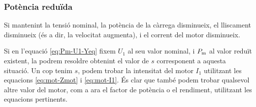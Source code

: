 	
\subsubsection{Potència reduïda}	

Si mantenint la tensió nominal, la potència de la càrrega disminueix, el lliscament disminueix (és a dir, la velocitat augmenta), i el corrent del motor disminueix.
	
Si en l'equació \eqref{eq:Pm-U1-Yeq} fixem $U_1$ al seu valor nominal, i  $P_\mathrm{m}$ al  valor reduït existent,  la podrem resoldre obtenint el valor de $s$ corresponent  a aquesta situació. Un cop tenim $s$, podem trobar la intensitat del motor $I_1$ utilitzant les equacions \eqref{eq:mot-Zmot} i \eqref{eq:mot-I1}. És clar que també podem trobar qualsevol altre valor del motor, com a ara el factor de potència o el rendiment, utilitzant les equacions pertinents.


